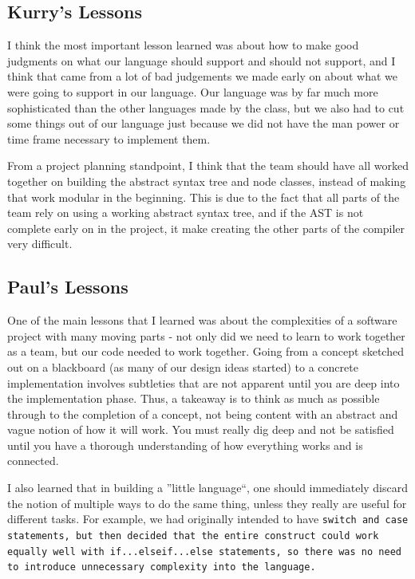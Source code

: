 \documentclass{report}
\begin{document}
\subsection{Kurry's Lessons}
\label{sub:kurrys-lessons}

I think the most important lesson learned was about how to make good judgments
on what our language should support and should not support, and I think that
came from a lot of bad judgements we made early on about what we were going to
support in our language. Our language was by far much more sophisticated than the
other languages made by the class, but we also had to cut some things out of our
language just because we did not have the man power or time frame necessary to
implement them. 

From a project planning standpoint, I think that the team should have all worked 
together on building the abstract syntax tree and node classes, instead of making
that work modular in the beginning. This is due to the fact that all parts of the team
rely on using a working abstract syntax tree, and if the AST is not complete early on
in the project, it make creating the other parts of the compiler very difficult. 

\subsection{Paul's Lessons}
\label{sub:pauls-lessons}

One of the main lessons that I learned was about the complexities of a software project with many moving parts - not only did we need to learn to work together as a team, but our code needed to work together. Going from a concept sketched out on a blackboard (as many of our design ideas started) to a concrete implementation involves subtleties that are not apparent until you are deep into the implementation phase. Thus, a takeaway is to think as much as possible through to the completion of a concept, not being content with an abstract and vague notion of how it will work. You must really dig deep and not be satisfied until you have a thorough understanding of how everything works and is connected.

I also learned that in building a ''little language``, one should immediately discard the notion of multiple ways to do the same thing, unless they really are useful for different tasks. For example, we had originally intended to have \tt switch \rm and \tt case \rm statements, but then decided that the entire construct could work equally well with \tt if...elseif...else \rm statements, so there was no need to introduce unnecessary complexity into the language. 
\end{document}
